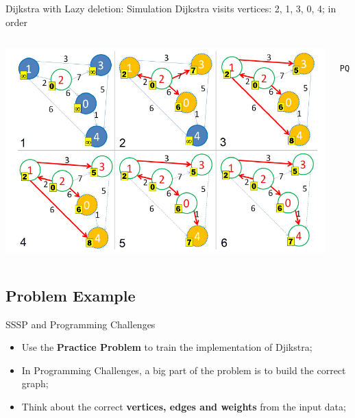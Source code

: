 \begin{frame}[fragile]{Dijkstra with Lazy deletion: Simulation}
  Dijkstra visits vertices: 2, 1, 3, 0, 4; in order
  \begin{columns}[T]
    \begin{center}
      \includegraphics[width=.9\textwidth]{../img/dijkstra_halim}
    \end{center}
\begin{verbatim}
 PQ:
\end{verbatim}
  \end{columns}
\end{frame}

\subsection{Problem Example}

\begin{frame}{SSSP and Programming Challenges}
  \begin{itemize}
    \item Use the {\bf Practice Problem} to train the implementation of Djikstra;\bigskip

    \item In Programming Challenges, a big part of the problem is to build the correct graph;\bigskip

    \item Think about the correct {\bf vertices, edges and weights} from the input data;
  \end{itemize}
\end{frame}

